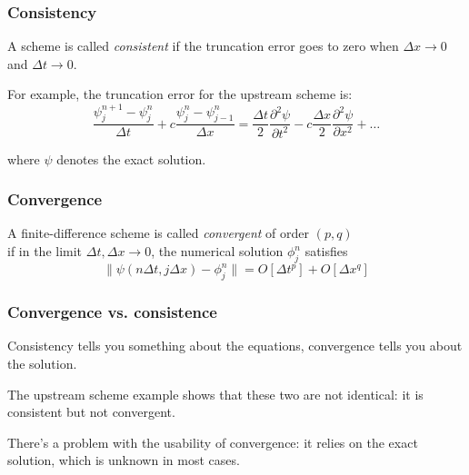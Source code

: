 \documentclass[aspectratio=149,9pt]{beamer}
\begin{document}
%
%
\begin{frame}
	\frametitle{Consistency}
	A scheme is called \emph{consistent} if the truncation error goes to zero when $\Delta x \rightarrow 0$ and $\Delta t \rightarrow 0$.
	\par\vspace*{3ex}
	For example, the truncation error for the upstream scheme is:\vspace*{2ex}
	\begin{equation*}
		\frac{\psi_j^{n+1} - \psi_j^n}{\Delta t}
		+ c \frac{\psi_j^n - \psi_{j-1}^n}{\Delta x} = 
		\frac{\Delta t}{2} \frac{\partial^2 \psi}{\partial t^2}
		- c \frac{\Delta x}{2} \frac{\partial^2 \psi}{\partial x^2} + \dots
	\end{equation*}\par\vspace*{2ex}
	where $\psi$ denotes the exact solution.
\end{frame}
%
%
\begin{frame}
	\frametitle{Convergence}
	A finite-difference scheme is called \emph{convergent} of order $(p,q)$\\ if in the limit $\Delta t, \Delta x \rightarrow 0$, the numerical solution $\phi_j^n$ satisfies\vspace*{4ex}
	\begin{equation*}
	\| \psi (n \Delta t, j \Delta x ) - \phi_j^n \| = O [ \Delta t^p ] + O [ \Delta x^q ]
	\end{equation*}
\end{frame}
%
%
\begin{frame}
	\frametitle{Convergence vs. consistence}
	Consistency tells you something about the equations, convergence tells you about the solution.
	\par\vspace*{3ex}
	The upstream scheme example shows that these two are not identical: it is consistent but not convergent.
	\par\vspace*{3ex}
	There's a problem with the usability of convergence: it relies on the exact solution, which is unknown in most cases.
\end{frame}
%
%
\end{document}
